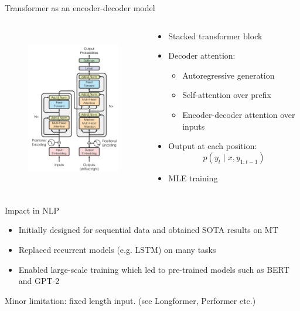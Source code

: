 \documentclass[usenames,dvipsnames,notes]{beamer}
\begin{document}
\begin{frame}
    {Transformer as an encoder-decoder model}
    \begin{columns}
        \begin{column}{.4\textwidth}
    \begin{figure}
        \includegraphics[height=7cm]{figures/transformer}
    \end{figure}
        \end{column}
        \begin{column}{.6\textwidth}
            \begin{itemize}
                \item Stacked transformer block
                \item Decoder attention:
                    \begin{itemize}
                        \item Autoregressive generation
                        \item Self-attention over prefix
                        \item Encoder-decoder attention over inputs
                    \end{itemize}
                \item Output at each position:
                    $$
                    p(y_t\mid x, y_{1:t-1})
                    $$
                \item MLE training
            \end{itemize}
        \end{column}
    \end{columns}
\end{frame}

\begin{frame}
    {Impact in NLP}
    \begin{itemize}
        \item Initially designed for sequential data and obtained SOTA results on MT
        \item Replaced recurrent models (e.g. LSTM) on many tasks
        \item Enabled large-scale training which led to pre-trained models such as BERT and GPT-2
    \end{itemize}

    Minor limitation: fixed length input. (see Longformer, Performer etc.)
\end{frame}
\end{document}
